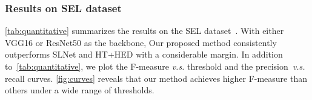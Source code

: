 \documentclass[10pt,journal,cspaper,compsoc]{IEEEtran}
\newcommand{\revise}[1]{{\textcolor{black}{#1}}}
\newcommand{\CheckRmv}[1]{}
\newcommand{\CheckRmv}[1]{#1}
\begin{document}
\subsubsection{Results on SEL dataset}
\cref{tab:quantitative} summarizes the results on the SEL dataset~\cite{lee2017semantic}.
%
With either VGG16 or ResNet50 as the backbone, Our proposed method consistently outperforms
SLNet and HT+HED with a considerable margin.
%
In addition to~\cref{tab:quantitative}, we plot the F-measure \emph{v.s.} threshold and
the precision~\emph{v.s.} recall curves.
%
\cref{fig:curves} reveals that our method achieves higher F-measure than others
under a wide range of thresholds.

\end{document}
